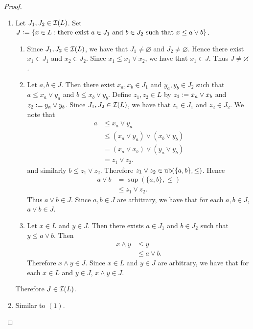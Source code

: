 \documentclass{book}
\begin{document}
	\begin{proof}\
		\begin{enumerate}
			\item Let $J_1, J_2 \in \mathcal{I}(L)$. Set $J \vcentcolon= \{x \in L: \text{there exist $a \in J_1$ and $b \in J_2$ such that $x \leq a \vee b$} \}$. 
			\begin{enumerate}
				\item Since $J_1, J_2 \in \mathcal{I}(L)$, we have that $J_1 \neq \varnothing$ and $J_2 \neq \varnothing$. Hence there exist $x_1 \in J_1$ and $x_2 \in J_2$. Since $x_1 \leq x_1 \vee x_2$, we have that $x_1 \in J$. Thus $J \neq \varnothing$. 
				\item Let $a,b \in J$. Then there exist $x_a, x_b \in J_1$ and $y_a, y_b \in J_2$ such that $a \leq x_a \vee y_a$ and $b \leq x_b \vee y_b$. Define $z_1, z_2 \in L$ by $z_1 \vcentcolon= x_a \vee x_b$ and $z_2 \vcentcolon= y_a \vee y_b$. Since $J_1, J_2 \in \mathcal{I}(L)$, we have that $z_1 \in J_1$ and $z_2 \in J_2$. We note that
				\begin{align*}
					a 
					& \leq x_a \vee y_a \\
					& \leq (x_a \vee y_a) \vee (x_b \vee y_b) \\
					& = (x_a \vee x_b) \vee (y_a \vee y_b) \\
					& = z_1 \vee z_2.
				\end{align*}
				and similarly $b \leq z_1 \vee z_2$. Therefore $z_1 \vee z_2 \in \operatorname{ub}(\{a, b\}, \leq)$. Hence
				\begin{align*}
					a \vee b
					& = \sup(\{a, b\}, \leq) \\
					& \leq z_1 \vee z_2.
				\end{align*}
				Thus $a \vee b \in J$. Since $a,b \in J$ are arbitrary, we have that for each $a,b \in J$, $a \vee b \in J$. 
				\item Let $x \in L$ and $y \in J$. Then there exists $a \in J_1$ and $b \in J_2$ such that $y \leq a \vee b$. Then 
				\begin{align*}
					x \wedge y
					& \leq y \\
					& \leq a \vee b. 
				\end{align*}
				Therefore $x \wedge y \in J$. Since $x \in L$ and $y \in J$ are arbitrary, we have that for each $x \in L$ and $y \in J$, $x \wedge y \in J$. 
			\end{enumerate}
			Therefore $J \in \mathcal{I}(L)$.
			\item Similar to $(1)$. 
		\end{enumerate}
	\end{proof}
	
\end{document}
